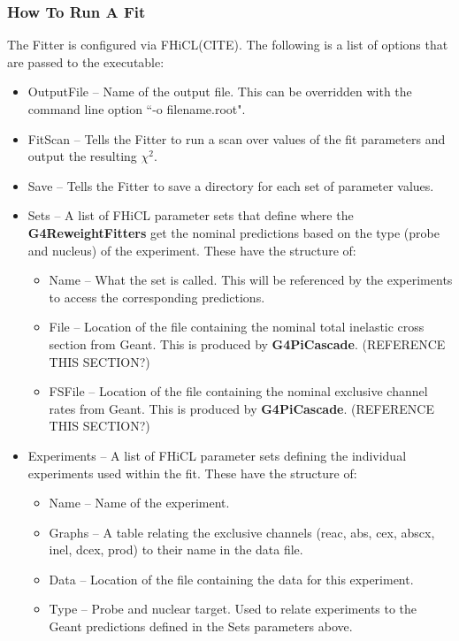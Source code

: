 \documentclass[12pt]{article}
\begin{document}
\subsubsection{How To Run A Fit}\label{sssec:HowToFit}
The Fitter is configured via FHiCL(CITE). The following is a list of options that are passed to the executable:
\begin{itemize}
	\item OutputFile -- Name of the output file. This can be overridden with the command line option ``-o  filename.root".
	\item FitScan -- Tells the Fitter to run a scan over values of the fit parameters and output the resulting $\chi^2$.
	\item Save -- Tells the Fitter to save a directory for each set of parameter values.
	\item Sets -- A list of FHiCL parameter sets that define where the \textbf{G4ReweightFitters} get the nominal predictions based on the type (probe and nucleus) of the experiment. These have the structure of:
	\begin{itemize}
		\item Name -- What the set is called. This will be referenced by the experiments to access the corresponding predictions.
		\item File -- Location of the file containing the nominal total inelastic cross section from Geant. This is produced by \textbf{G4PiCascade}. (REFERENCE THIS SECTION?)
		\item FSFile -- Location of the file containing the nominal exclusive channel rates from Geant. This is produced by \textbf{G4PiCascade}. (REFERENCE THIS SECTION?)
	\end{itemize}
	\item Experiments -- A list of FHiCL parameter sets defining the individual experiments used within the fit. These have the structure of:
	\begin{itemize}
		\item Name -- Name of the experiment.
		\item Graphs -- A table relating the exclusive channels (reac, abs, cex, abscx, inel, dcex, prod) to their name in the data file.
		\item Data -- Location of the file containing the data for this experiment. 
		\item Type -- Probe and nuclear target. Used to relate experiments to the Geant predictions defined in the Sets parameters above.
	\end{itemize}

\end{itemize}
\end{document}
